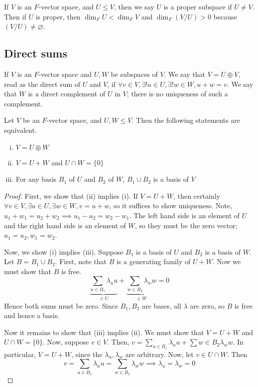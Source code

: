 \begin{remark}
	If \( V \) is an \( F \)-vector space, and \( U \leq V \), then we say \( U \) is a proper subspace if \( U \neq V \).
	Then if \( U \) is proper, then \( \dim_F U < \dim_F V \) and \( \dim_F ( V / U ) > 0 \) because \( (V/U) \neq \varnothing \).
\end{remark}

\subsection{Direct sums}
\begin{definition}
	If \( V \) is an \( F \)-vector space and \( U, W \) be subspaces of \( V \).
	We say that \( V = U \oplus V \), read as the direct sum of \( U \) and \( V \), if \( \forall v \in V, \exists!
	u \in U, \exists!
	w \in W, u + w = v \).
	We say that \( W \) is \textit{a} direct complement of \( U \) in \( V \); there is no uniqueness of such a complement.
\end{definition}
\begin{lemma}
	Let \( V \) be an \( F \)-vector space, and \( U, W \leq V \).
	Then the following statements are equivalent.
	\begin{enumerate}[(i)]
		\item \( V = U \oplus W \)
		\item \( V = U + W \) and \( U \cap W = \{0\} \)
		\item For any basis \( B_1 \) of \( U \) and \( B_2 \) of \( W \), \( B_1 \cup B_2 \) is a basis of \( V \)
	\end{enumerate}
\end{lemma}
\begin{proof}
	First, we show that (ii) implies (i).
	If \( V = U + W \), then certainly \( \forall v \in V, \exists u \in U, \exists w \in W, v = u + w \), so it suffices to show uniqueness.
	Note, \( u_1 + w_1 = u_2 + w_2 \implies u_1 - u_2 = w_2 - w_1 \).
	The left hand side is an element of \( U \) and the right hand side is an element of \( W \), so they must be the zero vector; \( u_1 = u_2, w_1 = w_2 \).

	Now, we show (i) implies (iii).
	Suppose \( B_1 \) is a basis of \( U \) and \( B_2 \) is a basis of \( W \).
	Let \( B = B_1 \cup B_2 \).
	First, note that \( B \) is a generating family of \( U + W \).
	Now we must show that \( B \) is free.
	\[
		\underbrace{\sum_{u \in B_1} \lambda_u u}_{\in U} + \underbrace{\sum_{w \in B_2} \lambda_w w}_{\in W} = 0
	\]
	Hence both sums must be zero.
	Since \( B_1, B_2 \) are bases, all \( \lambda \) are zero, so \( B \) is free and hence a basis.

	Now it remains to show that (iii) implies (ii).
	We must show that \( V = U + W \) and \( U \cap W = \{0\} \).
	Now, suppose \( v \in V \).
	Then, \( v = \sum_{u \in B_1} \lambda_u u + \sum{w \in B_2} \lambda_w w \).
	In particular, \( V = U + W \), since the \( \lambda_u, \lambda_w \) are arbitrary.
	Now, let \( v \in U \cap W \).
	Then
	\[
		v = \sum_{u \in B_1} \lambda_u u = \sum_{w \in B_2} \lambda_w w \implies \lambda_u = \lambda_w = 0
	\]
\end{proof}


